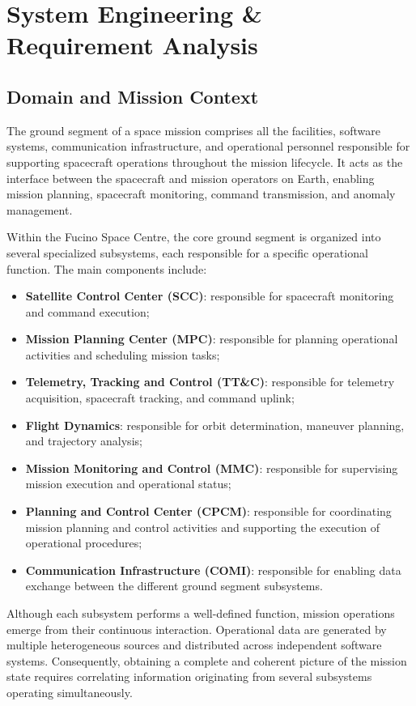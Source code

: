 \chapter{System Engineering \& Requirement Analysis}

\section{Domain and Mission Context}

The ground segment of a space mission comprises all the facilities, software systems, communication infrastructure, and operational personnel responsible for supporting spacecraft operations throughout the mission lifecycle. It acts as the interface between the spacecraft and mission operators on Earth, enabling mission planning, spacecraft monitoring, command transmission, and anomaly management.

Within the Fucino Space Centre, the core ground segment is organized into several specialized subsystems, each responsible for a specific operational function. The main components include:

\begin{itemize}
    \item \textbf{Satellite Control Center (SCC)}: responsible for spacecraft monitoring and command execution;
    \item \textbf{Mission Planning Center (MPC)}: responsible for planning operational activities and scheduling mission tasks;
    \item \textbf{Telemetry, Tracking and Control (TT\&C)}: responsible for telemetry acquisition, spacecraft tracking, and command uplink;
    \item \textbf{Flight Dynamics}: responsible for orbit determination, maneuver planning, and trajectory analysis;
    \item \textbf{Mission Monitoring and Control (MMC)}: responsible for supervising mission execution and operational status;
    \item \textbf{Planning and Control Center (CPCM)}: responsible for coordinating mission planning and control activities and supporting the execution of operational procedures;
    \item \textbf{Communication Infrastructure (COMI)}: responsible for enabling data exchange between the different ground segment subsystems.
\end{itemize}

Although each subsystem performs a well-defined function, mission operations emerge from their continuous interaction. Operational data are generated by multiple heterogeneous sources and distributed across independent software systems. Consequently, obtaining a complete and coherent picture of the mission state requires correlating information originating from several subsystems operating simultaneously.

